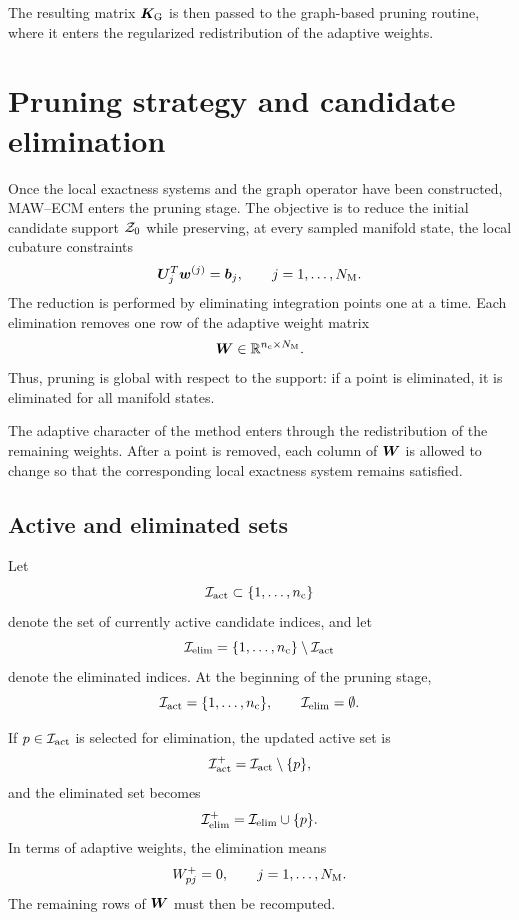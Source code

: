 \documentclass[11pt,a4paper]{article}
\begin{document}
The resulting matrix $\bm K_{\mathrm{G}}$ is then passed to the graph-based pruning
routine, where it enters the regularized redistribution of the adaptive
weights.


\section{Pruning strategy and candidate elimination}
\label{sec:pruning_strategy}

Once the local exactness systems and the graph operator have been constructed,
MAW--ECM enters the pruning stage. The objective is to reduce the initial
candidate support $\mathcal{Z}_{0}$ while preserving, at every sampled manifold state,
the local cubature constraints
\[
        \bm U_j^T\bm w^{(j)}=\bm b_j,
        \qquad
        j=1,\ldots,N_{\mathrm{M}}.
\]
The reduction is performed by eliminating integration points one at a time.
Each elimination removes one row of the adaptive weight matrix
\[
        \bm W\in\mathbb{R}^{n_{\mathrm{c}}\times N_{\mathrm{M}}}.
\]
Thus, pruning is global with respect to the support: if a point is eliminated,
it is eliminated for all manifold states.

The adaptive character of the method enters through the redistribution of the
remaining weights. After a point is removed, each column of $\bm W$ is allowed
to change so that the corresponding local exactness system remains satisfied.

\subsection{Active and eliminated sets}

Let
\[
        \mathcal{I}_{\mathrm{act}} \subset \{1,\ldots,n_{\mathrm{c}}\}
\]
denote the set of currently active candidate indices, and let
\[
        \mathcal{I}_{\mathrm{elim}}
        =
        \{1,\ldots,n_{\mathrm{c}}\}\setminus\mathcal{I}_{\mathrm{act}}
\]
denote the eliminated indices. At the beginning of the pruning stage,
\[
        \mathcal{I}_{\mathrm{act}} = \{1,\ldots,n_{\mathrm{c}}\},
        \qquad
        \mathcal{I}_{\mathrm{elim}}=\emptyset.
\]

If $p\in\mathcal{I}_{\mathrm{act}}$ is selected for elimination, the updated active set is
\[
        \mathcal{I}_{\mathrm{act}}^{+}
        =
        \mathcal{I}_{\mathrm{act}}\setminus\{p\},
\]
and the eliminated set becomes
\[
        \mathcal{I}_{\mathrm{elim}}^{+}
        =
        \mathcal{I}_{\mathrm{elim}}\cup\{p\}.
\]
In terms of adaptive weights, the elimination means
\[
        W_{pj}^{+}=0,
        \qquad
        j=1,\ldots,N_{\mathrm{M}}.
\]
The remaining rows of $\bm W$ must then be recomputed.
\end{document}
